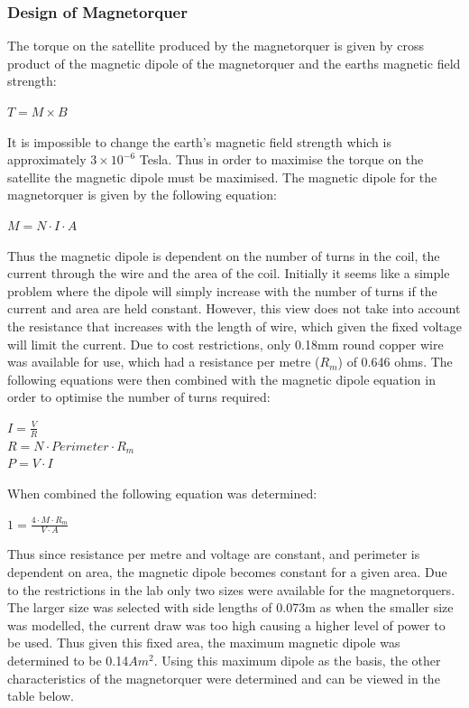 \subsubsection{Design of Magnetorquer}
The torque on the satellite produced by the magnetorquer is given by cross product of the magnetic dipole of the magnetorquer and the earths magnetic field strength: 
\begin{center}
    $T = M \times B$
\end{center}
It is impossible to change the earth's magnetic field strength which is approximately $3 \times 10^{-6}$ Tesla.  Thus in order to maximise the torque on the satellite the magnetic dipole must be maximised. The magnetic dipole for the magnetorquer is given by the following equation:
\begin{center}
    $M = N \cdot I \cdot A$
\end{center}
Thus the magnetic dipole is dependent on the number of turns in the coil, the current through the wire and the area of the coil.  Initially it seems like a simple problem where the dipole will simply increase with the number of turns if the current and area are held constant.  However, this view does not take into account the resistance that increases with the length of wire, which given the fixed voltage will limit the current.  Due to cost restrictions, only 0.18mm round copper wire was available for use, which had a resistance per metre ($R_m$) of 0.646 ohms.  The following equations were then combined with the magnetic dipole equation in order to optimise the number of turns required:
\begin{center}
    $I = \frac{V}{R}$\vspace{2mm}\\
    $R = N \cdot Perimeter \cdot R_m$ \vspace{2mm}\\
    $P = V \cdot I$
\end{center}
When combined the following equation was determined:
\begin{center}
    $1 = \frac{4 \cdot M \cdot R_m}{V \cdot A}$
\end{center}
Thus since resistance per metre and voltage are constant, and perimeter is dependent on area, the magnetic dipole becomes constant for a given area.  Due to the restrictions in the lab only two sizes were available for the magnetorquers. The larger size was selected with side lengths of 0.073m as when the smaller size was modelled, the current draw was too high causing a higher level of power to be used.  Thus given this fixed area, the maximum magnetic dipole was determined to be  0.14$Am^2$.  Using this maximum dipole as the basis, the other characteristics of the magnetorquer were determined and can be viewed in the table below.
